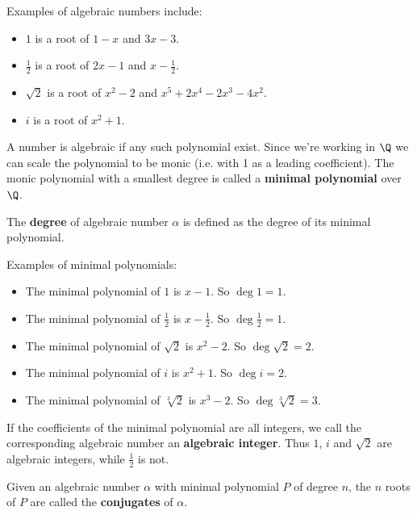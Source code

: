 \begin{ex} Examples of algebraic numbers include:
\begin{itemize}
\item $1$ is a root of $1-x$ and $3x-3$.
\item $\frac{1}{2}$ is a root of $2x - 1$ and $x - \frac{1}{2}$.
\item $\sqrt{2}$ is a root of $x^2 - 2$ and $x^5 + 2x^4 - 2x^3 - 4x^2$.
\item $i$ is a root of $x^2 + 1$.
\end{itemize}
\end{ex}

\begin{df}
A number is algebraic if any such polynomial exist. Since we're working in $\Q$ we can scale the polynomial to be monic (i.e. with 1 as a leading coefficient). The monic polynomial with a smallest degree is called a \textbf{minimal polynomial} over $\Q$.
\end{df}

\begin{df}
The \textbf{degree} of algebraic number $\alpha$ is defined as the degree of its minimal polynomial.
\end{df}

\begin{ex} Examples of minimal polynomials:
\begin{itemize}
\item The minimal polynomial of $1$ is $x-1$. So $\deg 1 = 1$.
\item The minimal polynomial of $\frac{1}{2}$ is $x - \frac{1}{2}$. So $\deg \frac{1}{2} = 1$.
\item The minimal polynomial of $\sqrt{2}$ is $x^2 - 2$. So $\deg \sqrt{2} = 2$.
\item The minimal polynomial of $i$ is $x^2 + 1$. So $\deg i = 2$.
\item The minimal polynomial of $\sqrt[3]{2}$ is $x^3 - 2$. So $\deg \sqrt[3]{2} = 3$.
\end{itemize}
\end{ex}

\begin{df}
If the coefficients of the minimal polynomial are all integers, we call the corresponding algebraic number an \textbf{algebraic integer}. Thus $1$, $i$ and $\sqrt{2}$ are algebraic integers, while $\frac{1}{2}$ is not.
\end{df}

\begin{df}
Given an algebraic number $\alpha$ with minimal polynomial $P$ of degree $n$, the $n$ roots of $P$ are called the \textbf{conjugates} of $\alpha$.
\end{df}

